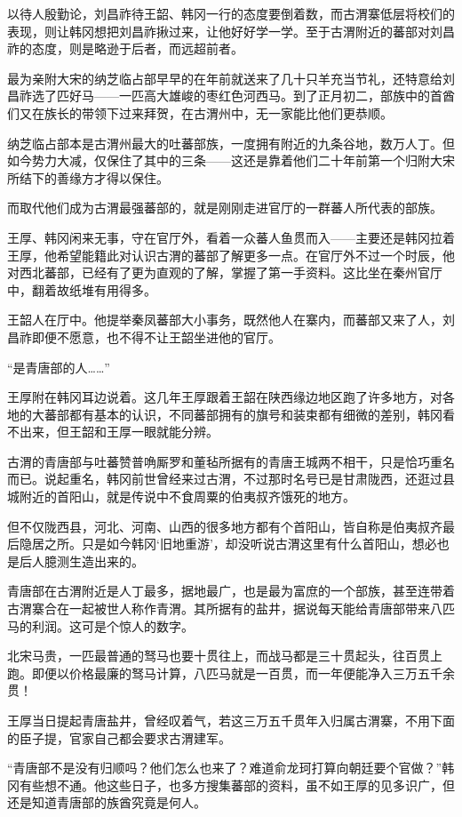 以待人殷勤论，刘昌祚待王韶、韩冈一行的态度要倒着数，而古渭寨低层将校们的表现，则让韩冈想把刘昌祚揪过来，让他好好学一学。至于古渭附近的蕃部对刘昌祚的态度，则是略逊于后者，而远超前者。

最为亲附大宋的纳芝临占部早早的在年前就送来了几十只羊充当节礼，还特意给刘昌祚选了匹好马——一匹高大雄峻的枣红色河西马。到了正月初二，部族中的首酋们又在族长的带领下过来拜贺，在古渭州中，无一家能比他们更恭顺。

纳芝临占部本是古渭州最大的吐蕃部族，一度拥有附近的九条谷地，数万人丁。但如今势力大减，仅保住了其中的三条——这还是靠着他们二十年前第一个归附大宋所结下的善缘方才得以保住。

而取代他们成为古渭最强蕃部的，就是刚刚走进官厅的一群蕃人所代表的部族。

王厚、韩冈闲来无事，守在官厅外，看着一众蕃人鱼贯而入——主要还是韩冈拉着王厚，他希望能籍此对认识古渭的蕃部了解更多一点。在官厅外不过一个时辰，他对西北蕃部，已经有了更为直观的了解，掌握了第一手资料。这比坐在秦州官厅中，翻着故纸堆有用得多。

王韶人在厅中。他提举秦凤蕃部大小事务，既然他人在寨内，而蕃部又来了人，刘昌祚即便不愿意，也不得不让王韶坐进他的官厅。

“是青唐部的人……”

王厚附在韩冈耳边说着。这几年王厚跟着王韶在陕西缘边地区跑了许多地方，对各地的大蕃部都有基本的认识，不同蕃部拥有的旗号和装束都有细微的差别，韩冈看不出来，但王韶和王厚一眼就能分辨。

古渭的青唐部与吐蕃赞普唃厮罗和董毡所据有的青唐王城两不相干，只是恰巧重名而已。说起重名，韩冈前世曾经来过古渭，不过那时名号已是甘肃陇西，还逛过县城附近的首阳山，就是传说中不食周粟的伯夷叔齐饿死的地方。

但不仅陇西县，河北、河南、山西的很多地方都有个首阳山，皆自称是伯夷叔齐最后隐居之所。只是如今韩冈‘旧地重游’，却没听说古渭这里有什么首阳山，想必也是后人臆测生造出来的。

青唐部在古渭附近是人丁最多，据地最广，也是最为富庶的一个部族，甚至连带着古渭寨合在一起被世人称作青渭。其所据有的盐井，据说每天能给青唐部带来八匹马的利润。这可是个惊人的数字。

北宋马贵，一匹最普通的驽马也要十贯往上，而战马都是三十贯起头，往百贯上跑。即便以价格最廉的驽马计算，八匹马就是一百贯，而一年便能净入三万五千余贯！

王厚当日提起青唐盐井，曾经叹着气，若这三万五千贯年入归属古渭寨，不用下面的臣子提，官家自己都会要求古渭建军。

“青唐部不是没有归顺吗？他们怎么也来了？难道俞龙珂打算向朝廷要个官做？”韩冈有些想不通。他这些日子，也多方搜集蕃部的资料，虽不如王厚的见多识广，但还是知道青唐部的族酋究竟是何人。

